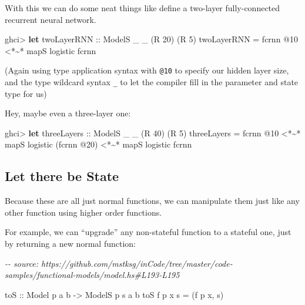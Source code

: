\documentclass[]{article}
\newenvironment{Shaded}{}{}
\newcommand{\CommentTok}[1]{\textcolor[rgb]{0.38,0.63,0.69}{\textit{#1}}}
\newcommand{\DataTypeTok}[1]{\textcolor[rgb]{0.56,0.13,0.00}{#1}}
\newcommand{\DecValTok}[1]{\textcolor[rgb]{0.25,0.63,0.44}{#1}}
\newcommand{\KeywordTok}[1]{\textcolor[rgb]{0.00,0.44,0.13}{\textbf{#1}}}
\newcommand{\NormalTok}[1]{#1}
\newcommand{\OperatorTok}[1]{\textcolor[rgb]{0.40,0.40,0.40}{#1}}
\newcommand{\OtherTok}[1]{\textcolor[rgb]{0.00,0.44,0.13}{#1}}
\begin{document}
With this we can do some neat things like define a two-layer fully-connected
recurrent neural network.

\begin{Shaded}
\begin{Highlighting}[]
\NormalTok{ghci}\OperatorTok{\textgreater{}} \KeywordTok{let}\OtherTok{ twoLayerRNN ::} \DataTypeTok{ModelS}\NormalTok{ \_ \_ (}\DataTypeTok{R} \DecValTok{20}\NormalTok{) (}\DataTypeTok{R} \DecValTok{5}\NormalTok{)}
\NormalTok{          twoLayerRNN }\OtherTok{=}\NormalTok{ fcrnn }\OperatorTok{@}\DecValTok{10} \OperatorTok{\textless{}*\textasciitilde{}*}\NormalTok{ mapS logistic fcrnn}
\end{Highlighting}
\end{Shaded}

(Again using type application syntax with \texttt{@10} to specify our hidden
layer size, and the type wildcard syntax \texttt{\_} to let the compiler fill in
the parameter and state type for us)

Hey, maybe even a three-layer one:

\begin{Shaded}
\begin{Highlighting}[]
\NormalTok{ghci}\OperatorTok{\textgreater{}} \KeywordTok{let}\OtherTok{ threeLayers ::} \DataTypeTok{ModelS}\NormalTok{ \_ \_ (}\DataTypeTok{R} \DecValTok{40}\NormalTok{) (}\DataTypeTok{R} \DecValTok{5}\NormalTok{)}
\NormalTok{          threeLayers }\OtherTok{=}\NormalTok{ fcrnn }\OperatorTok{@}\DecValTok{10}
                   \OperatorTok{\textless{}*\textasciitilde{}*}\NormalTok{ mapS logistic (fcrnn }\OperatorTok{@}\DecValTok{20}\NormalTok{)}
                   \OperatorTok{\textless{}*\textasciitilde{}*}\NormalTok{ mapS logistic fcrnn}
\end{Highlighting}
\end{Shaded}

\subsection{Let there be State}\label{let-there-be-state}

Because these are all just normal functions, we can manipulate them just like
any other function using higher order functions.

For example, we can ``upgrade'' any non-stateful function to a stateful one,
just by returning a new normal function:

\begin{Shaded}
\begin{Highlighting}[]
\CommentTok{{-}{-} source: https://github.com/mstksg/inCode/tree/master/code{-}samples/functional{-}models/model.hs\#L193{-}L195}

\OtherTok{toS ::} \DataTypeTok{Model}\NormalTok{  p   a b}
    \OtherTok{{-}\textgreater{}} \DataTypeTok{ModelS}\NormalTok{ p s a b}
\NormalTok{toS f p x s }\OtherTok{=}\NormalTok{ (f p x, s)}
\end{Highlighting}
\end{Shaded}
\end{document}
